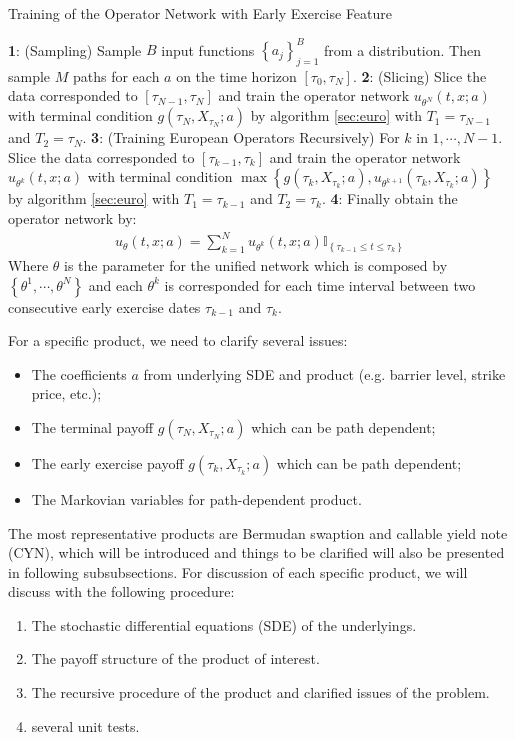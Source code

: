\documentclass[11pt,a4paper]{article}
\theoremstyle{remark}
\begin{document}
		\begin{algorithm} [htbp!]
		\begin{algorithmic}[htbp!] 
			\caption{Training of the Operator Network with Early Exercise Feature} \label{alg:euro_bermudan}
			\STATE \textbf{1}: (Sampling) Sample $B$ input functions $\left\{a_j\right\}_{j=1}^B$ from a distribution. Then sample $M$ paths for each $a$ on the time horizon $[\tau_0, \tau_N]$. 
			\STATE \textbf{2}: (Slicing) Slice the data corresponded to $[\tau_{N-1}, \tau_{N}]$ and train the operator network $u_{\theta^{N}}(t,x;a)$ with terminal condition $g(\tau_{N}, X_{\tau_N}; a)$ by algorithm \ref{sec:euro} with $T_1 = \tau_{N-1}$ and $T_2 = \tau_{N}$.
			\STATE \textbf{3}: (Training European Operators Recursively) For $k$ in $1,\cdots,N-1$. Slice the data corresponded to $[\tau_{k-1}, \tau_{k}]$ and train the operator network $u_{\theta^{k}}(t,x;a)$ with terminal condition $\max\left\{g(\tau_k, X_{\tau_k};a), u_{\theta^{k+1}}(\tau_k,X_{\tau_k};a) \right\}$ by algorithm  \ref{sec:euro} with $T_1 = \tau_{k-1}$ and $T_2 = \tau_{k}$.
			\STATE  \textbf{4}: Finally obtain the operator network by:
			\begin{align*}
				u_{\theta}(t, x; a) = \sum_{k=1}^N u_{\theta^{k}}(t,x; a) \mathbb{I}_{\left\{\tau_{k-1}\leq t \leq \tau_{k}\right\}}
			\end{align*}
			Where $\theta$ is the parameter for the unified network which is  composed by $\left\{\theta^1, \cdots, \theta^N \right\}$ and each $\theta^k$ is corresponded for each time interval between two consecutive early exercise dates $\tau_{k-1}$ and $\tau_k$.
		\end{algorithmic}
	\end{algorithm}
	For a specific product, we need to clarify several issues:
	\begin{itemize}
		\item The coefficients $a$ from underlying SDE and  product (e.g. barrier level, strike price, etc.); 
		\item The terminal payoff $g(\tau_N, X_{\tau_N}; a)$ which can be path dependent; 
		\item The early exercise payoff $g(\tau_k, X_{\tau_k}; a)$ which can be path dependent; 
		\item The Markovian variables for path-dependent product.
	\end{itemize}
	The most representative products are Bermudan swaption and callable yield note (CYN), which will be introduced and things to be clarified will also be presented in following subsubsections.
	For discussion of each specific product, we will discuss with the following procedure:
	\begin{enumerate}
		\item The stochastic differential equations (SDE) of the underlyings.
		\item The payoff structure of the product of interest.
		\item The recursive procedure of the product and clarified issues of the problem.
		\item several unit tests.
	\end{enumerate}
	
\end{document}
